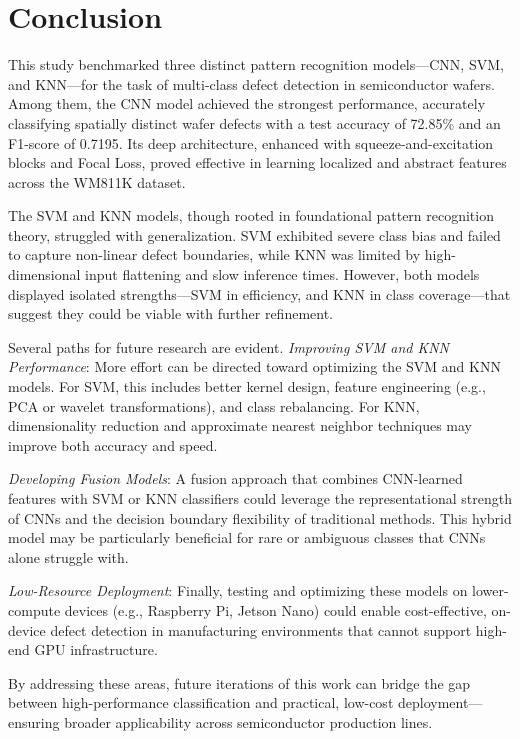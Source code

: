 \documentclass[conference]{IEEEtran}
\begin{document}
\section{Conclusion}
This study benchmarked three distinct pattern recognition models—CNN, SVM, and KNN—for the task of multi-class defect detection in semiconductor wafers. 
Among them, the CNN model achieved the strongest performance, accurately classifying spatially distinct wafer defects with a test accuracy of 72.85\% and an F1-score of 0.7195. 
Its deep architecture, enhanced with squeeze-and-excitation blocks and Focal Loss, proved effective in learning localized and abstract features across the WM811K dataset.

The SVM and KNN models, though rooted in foundational pattern recognition theory, struggled with generalization. 
SVM exhibited severe class bias and failed to capture non-linear defect boundaries, while KNN was limited by high-dimensional input flattening and slow inference times. 
However, both models displayed isolated strengths—SVM in efficiency, and KNN in class coverage—that suggest they could be viable with further refinement.

Several paths for future research are evident. 
\textit{Improving SVM and KNN Performance}: More effort can be directed toward optimizing the SVM and KNN models. 
For SVM, this includes better kernel design, feature engineering (e.g., PCA or wavelet transformations), and class rebalancing. 
For KNN, dimensionality reduction and approximate nearest neighbor techniques may improve both accuracy and speed.

\textit{Developing Fusion Models}: A fusion approach that combines CNN-learned features with SVM or KNN classifiers could leverage the representational strength of CNNs and the decision boundary flexibility of traditional methods. 
This hybrid model may be particularly beneficial for rare or ambiguous classes that CNNs alone struggle with.

\textit{Low-Resource Deployment}: Finally, testing and optimizing these models on lower-compute devices (e.g., Raspberry Pi, Jetson Nano) could enable cost-effective, on-device defect detection in manufacturing environments that cannot support high-end GPU infrastructure.

By addressing these areas, future iterations of this work can bridge the gap between high-performance classification and practical, low-cost deployment—ensuring broader applicability across semiconductor production lines.
\end{document}
